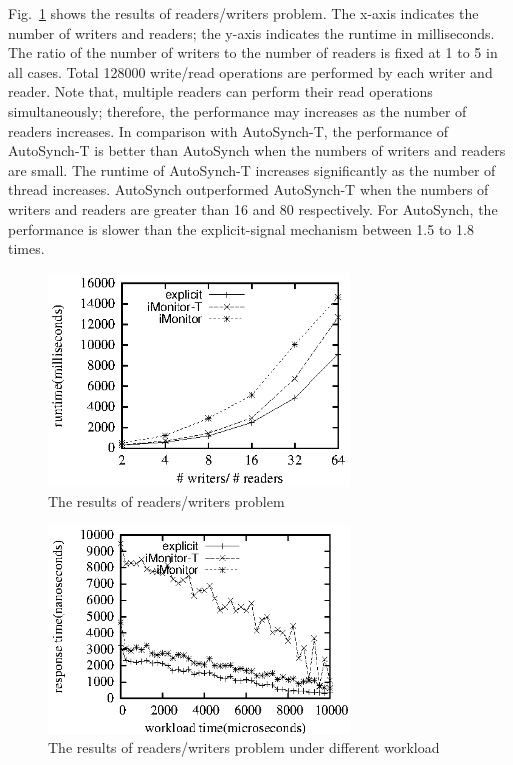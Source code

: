 \documentclass[preprint]{sigplanconf}
\begin{document}
Fig.~\ref{fig:rw_eval} shows the results of readers/writers problem. The
x-axis indicates the number of writers and readers; the y-axis indicates the
runtime in milliseconds. The ratio of the number of writers to the number of
readers is fixed at 1 to 5 in all cases. Total 128000 write/read operations are
performed by each writer and reader. Note that, multiple readers can perform
their read operations simultaneously; therefore, the performance may increases
as the number of readers increases. In comparison with AutoSynch-T, the
performance of AutoSynch-T is better than AutoSynch when the numbers of writers
and readers are small. The runtime of AutoSynch-T increases significantly as 
the number of thread increases. AutoSynch outperformed AutoSynch-T when the
numbers of writers and readers are greater than 16 and 80 respectively. For 
AutoSynch, the performance is slower than the explicit-signal mechanism between 
1.5 to 1.8 times.


\begin{figure}[ht!]
  \centering
  \includegraphics[width=80mm]{fig/trw.eps}
  \caption{The results of readers/writers problem}
  \label{fig:rw_eval}
\end{figure}


\begin{figure}[ht!]
  \centering
  \includegraphics[width=80mm]{fig/strw.eps}
  \caption{The results of readers/writers problem under different workload}
  \label{fig:srw_eval}
\end{figure}
\end{document}

